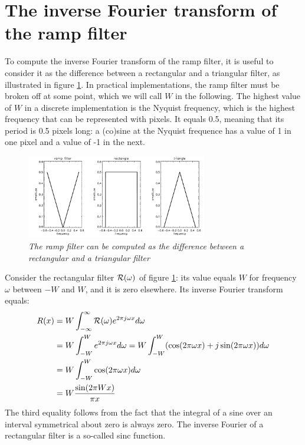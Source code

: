 \newpage
\section{The inverse Fourier transform of the ramp filter} \label{app:ramp}
To compute the inverse Fourier transform of the ramp filter, it is
useful to consider it as the difference between a rectangular and a
triangular filter, as illustrated in figure \ref{fig:rampapp2}. In
practical implementations, the ramp filter must be broken off at some
point, which we will call $W$ in the following. The highest value of
$W$ in a discrete implementation is the Nyquist frequency, which is
the highest frequency that can be represented with pixels. It equals
0.5, meaning that its period is 0.5 pixels long: a (co)sine at the
Nyquist frequence has a value of 1 in one pixel and a value of -1 in
the next.

\begin{figure}[tbh]
\centering
\includegraphics[width=0.7\textwidth]{figs/fig_rampfilter2_app.pdf}
\caption{\label{fig:rampapp2} \emph{The ramp filter can be computed as
    the difference between a rectangular and a triangular filter}}
\end{figure}

Consider the rectangular filter ${\cal R}(\omega)$ of figure  \ref{fig:rampapp2}: its
value equals $W$ for frequency $\omega$ between $-W$ and $W$, and it is
zero elsewhere. Its inverse Fourier transform equals:
\begin{align}
R(x) & =  W \int_{-\infty}^{\infty} {\cal R}(\omega) e^{2\pi j \omega x} 
           d\omega \nonumber \\
 &= W \int_{-W}^W e^{2\pi j \omega x} d\omega = W \int_{-W}^W (\cos(2\pi \omega x) + j \sin(2\pi \omega x)) d\omega 
       \nonumber \\
 &= W \int_{-W}^W \cos(2\pi \omega x) d\omega \nonumber \\
 & = W \frac{\sin(2\pi W x)}{\pi x} 
\end{align}
The third equality follows from the fact that the integral of a sine
over an interval symmetrical about zero is always zero. The inverse
Fourier of a rectangular filter is a so-called sinc function.

